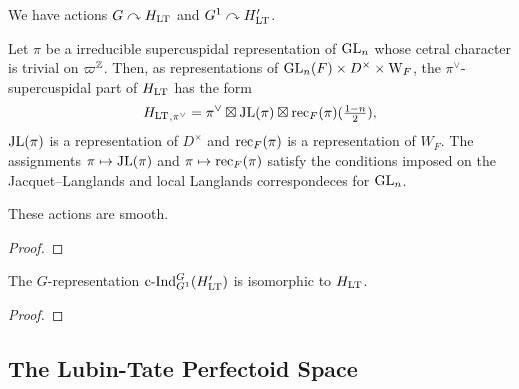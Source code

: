 \documentclass[../main.tex]{subfiles}
\begin{document}
We have actions $G \curvearrowright H_{\mathrm{LT}}$ and $G^1 \curvearrowright H_{\mathrm{LT}}'$. 
\begin{thm}\label{thm:NonAbLTT}
  Let $\pi$ be a irreducible supercuspidal representation of $\operatorname{GL}_n$ whose cetral 
  character is trivial on $\varpi^{\mathbb{Z}}$. Then, as representations of 
  $\operatorname{GL}_n(F) \times D^\times \times \mathrm W_F$, the $\pi^\vee$-supercuspidal part
  of $H_{\mathrm{LT}}$ has the form
  \begin{equation} \label{eq:DefRecJL}
    {H_{\mathrm{LT}}}_{,\pi^\vee} = \pi^\vee \boxtimes \mathrm{JL}(\pi) \boxtimes
                  \mathrm{rec}_F(\pi)(\tfrac {1-n}2),
  \end{equation}
  $\mathrm{JL}(\pi)$ is a representation of $D^\times$ and $\mathrm{rec}_F(\pi)$ is a representation of 
  $W_F$. The assignments $\pi \mapsto \mathrm{JL}(\pi)$ and 
  $\pi \mapsto \mathrm{rec}_F(\pi)$ satisfy the conditions imposed on the 
  Jacquet--Langlands and local Langlands correspondeces for $\operatorname{GL}_n$.
\end{thm}

\begin{lem}\label{lem:GActsSmoothlyOnHLT}
  These actions are smooth.
  \begin{proof}
  \end{proof}
\end{lem}

\begin{lem}\label{lem:InductionStatementOnHLT}
  The $G$-representation $\mathrm{c\text{-}Ind}_{G^1}^G (H'_{\mathrm{LT}})$ is isomorphic to $H_{\mathrm{LT}}$. 
\begin{proof}
\end{proof}
\end{lem}


\subsection{The Lubin-Tate Perfectoid Space} %
\label{sub:The Lubin-Tate Perfectoid Space}


\end{document}
